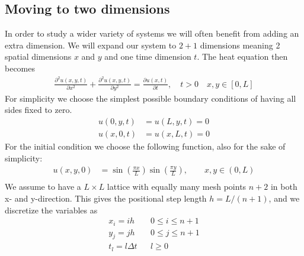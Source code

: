 \documentclass[%
 reprint,
nofootinbib,
aps,
]{revtex4-1}
\begin{document}
\subsection{Moving to two dimensions}\label{sec:2D}
In order to study a wider variety of systems we will often benefit from adding an extra dimension. We will expand our system to $2+1$ dimensions meaning 2 spatial dimensions $x$ and $y$ and one time dimension $t$. The heat equation then becomes
\begin{align}
    \frac{\partial^2 u(x,y,t)}{\partial x^2} + \frac{\partial^2 u(x,y,t)}{\partial y^2} = \frac{\partial u(x,t)}{\partial t}, \quad t>0 \quad x,y \in [0,L]
    \label{eq:2D_HQ}
\end{align}
For simplicity we choose the simplest possible boundary conditions of having all sides fixed to zero.
\begin{align*}
      u(0,y,t) &= u(L,y,t) = 0 \\
      u(x,0,t) &= u(x, L, t) = 0
\end{align*}
For the initial condition we choose the following function, also for the sake of simplicity:
\begin{align*}
     u(x,y,0) &= \sin{(\frac{\pi x}{L})} \sin{(\frac{\pi y}{L})}, \qquad x,y \in (0,L) \\
\end{align*}
We assume to have a $L\times L$ lattice with equally many mesh points $n+2$ in both x- and y-direction. This gives the positional step length $h = L/(n+1)$, and we discretize the variables as
\begin{align*}
    &x_i = ih&  &0 \le i \le n+1& \\
    &y_j = jh&  &0 \le j \le n+1& \\
    &t_l = l\Delta t& &l \ge 0&
\end{align*}
\end{document}
